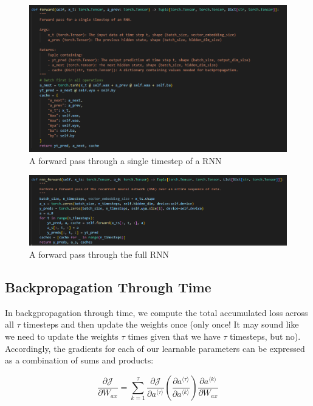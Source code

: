\documentclass[12pt]{article}
\begin{document}
\begin{figure}[H]
    \centering
    \includegraphics[width=1.0\textwidth]{./RNN_forward_pass_python.png} %
	\caption{A forward pass through a single timestep of a RNN}
\end{figure}

\begin{figure}[H]
    \centering
    \includegraphics[width=1.0\textwidth]{./RNN_net_full_pass.png} %
	\caption{A forward pass through the full RNN}
\end{figure}



\subsection{Backpropagation Through Time}

In backgpropagation through time, we compute the total accumulated loss across all \(\tau\) timesteps and then update the weights once (only once! It may sound like we need to update the weights \(\tau\) times given that we have \(\tau\) timesteps, but no). Accordingly, the gradients for each of our learnable parameters can be expressed as a combination of sums and products:

\[
\frac{\partial \mathcal{J}}{\partial W_{ax}} = \sum_{k=1}^{\tau} \frac{\partial \mathcal{J}}{\partial a^{\langle \tau \rangle}} \left( \frac{\partial a^{\langle \tau \rangle}}{\partial a^{\langle k \rangle}} \right) \frac{\partial a^{\langle k \rangle}}{\partial W_{ax}}
\]
\end{document}
